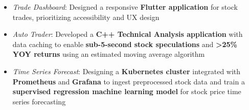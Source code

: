 \begin{itemize}
  \item \textit{Trade Dashboard}: Designed a responsive \textbf{Flutter application} for stock trades, prioritizing accessibility and UX design
  \item \textit{Auto Trader}: Developed a \textbf{C++ Technical Analysis application} with data caching to enable \textbf{sub-5-second stock speculations} and \textbf{\textgreater{}25\% YOY returns} using an estimated moving average algorithm
  \item \textit{Time Series Forecast}: Designing a \textbf{Kubernetes cluster} integrated with \textbf{Prometheus} and \textbf{Grafana} to ingest preprocessed stock data and train a \textbf{supervised regression machine learning model} for stock price time series forecasting
\end{itemize}